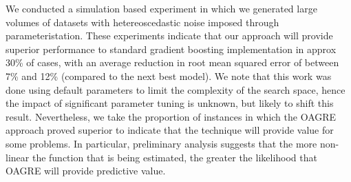 \documentclass[12pt,a4paper]{article}
\begin{document}
We conducted a simulation based experiment in which we generated large volumes of datasets with hetereoscedastic noise
imposed through parameteristation. These experiments indicate that our approach will provide superior
performance to standard gradient boosting implementation in approx 30\% of cases, with an average reduction in root mean
squared error of between 7\% and 12\% (compared to the next best model). 
We note that this work was done using default parameters to limit the complexity of the search space, hence the impact of 
significant parameter tuning is unknown, but likely to shift this result. Nevertheless, we take the proportion of instances
in which the OAGRE approach proved superior to indicate that the technique will provide value for some problems. In particular,
preliminary analysis suggests that the more non-linear the function that is being estimated, the greater the likelihood that
OAGRE will provide predictive value.



\end{document}
